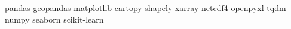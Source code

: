 pandas
geopandas
matplotlib
cartopy
shapely
xarray
netcdf4
openpyxl
tqdm
numpy
seaborn
scikit-learn
